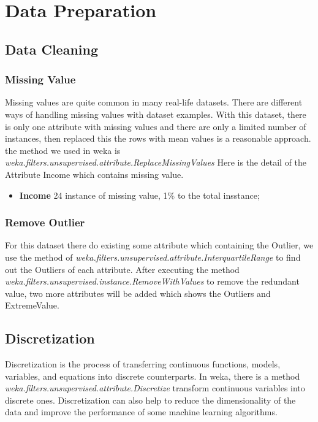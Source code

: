 \chapter{Data Preparation}

\section{Data Cleaning}

\subsection{Missing Value}
Missing values are quite common in many real-life datasets. There are different ways of handling missing values with dataset examples.
With this dataset, there is only one attribute with missing values and there are only a limited number of instances, then replaced this the rows with mean values is a reasonable approach.
the method we used in weka is \textit{weka.filters.unsupervised.attribute.ReplaceMissingValues}
Here is the detail of the Attribute Income which contains missing value.
\begin{itemize}
    \item \textbf{Income} 24 instance of missing value, 1\% to the total insstance;
\end{itemize}


\subsection{Remove Outlier}
For this dataset there do existing some attribute which containing the Outlier, we use the method of \textit{weka.filters.unsupervised.attribute.InterquartileRange} to find out the Outliers of each attribute.
After executing the method \textit{weka.filters.unsupervised.instance.RemoveWithValues} to remove the redundant value, two more attributes will be added which shows the Outliers and ExtremeValue. 

\section{Discretization}
Discretization is the process of transferring continuous functions, models, variables, and equations into discrete counterparts.  
In weka, there is a method \textit{weka.filters.unsupervised.attribute.Discretize} transform continuous variables into discrete ones. Discretization can also help to reduce the dimensionality of the data and improve the performance of some machine learning algorithms.

